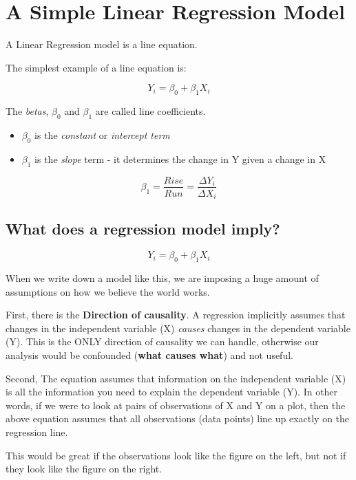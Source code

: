 \documentclass[
]{book}
\begin{document}
\hypertarget{a-simple-linear-regression-model}{%
\section{A Simple Linear Regression Model}\label{a-simple-linear-regression-model}}

A Linear Regression model is a line equation.

The simplest example of a line equation is:

\[Y_i=\beta_0+\beta_1X_i\]

The \emph{betas}, \(\beta_0\) and \(\beta_1\) are called line coefficients.

\begin{itemize}
\item
  \(\beta_0\) is the \emph{constant} or \emph{intercept term}
\item
  \(\beta_1\) is the \emph{slope} term - it determines the change in Y given a change in X
\end{itemize}

\[\beta_1=\frac{Rise}{Run}=\frac{\Delta Y_i}{\Delta X_i}\]

\hypertarget{what-does-a-regression-model-imply}{%
\subsection{What does a regression model imply?}\label{what-does-a-regression-model-imply}}

\[Y_i=\beta_0+\beta_1X_i\]

When we write down a model like this, we are imposing a huge amount of assumptions on how we believe the world works.

First, there is the \textbf{Direction of causality}. A regression implicitly assumes that changes in the independent variable (X) \emph{causes} changes in the dependent variable (Y). This is the ONLY direction of causality we can handle, otherwise our analysis would be confounded (\textbf{what causes what}) and not useful.

Second, The equation assumes that information on the independent variable (X) is all the information you need to explain the dependent variable (Y). In other words, if we were to look at pairs of observations of X and Y on a plot, then the above equation assumes that all observations (data points) line up exactly on the regression line.

This would be great if the observations look like the figure on the left, but not if they look like the figure on the right.
\end{document}
